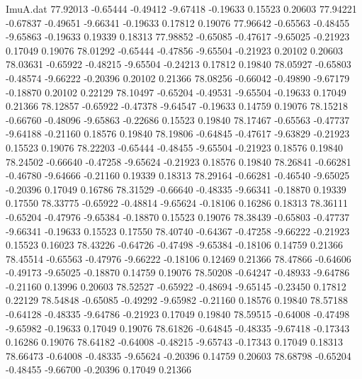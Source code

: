 \begin{filecontents}{ImuA.dat}
  77.92013   -0.65444   -0.49412   -9.67418   -0.19633    0.15523    0.20603
  77.94221   -0.67837   -0.49651   -9.66341   -0.19633    0.17812    0.19076
  77.96642   -0.65563   -0.48455   -9.65863   -0.19633    0.19339    0.18313
  77.98852   -0.65085   -0.47617   -9.65025   -0.21923    0.17049    0.19076
  78.01292   -0.65444   -0.47856   -9.65504   -0.21923    0.20102    0.20603
  78.03631   -0.65922   -0.48215   -9.65504   -0.24213    0.17812    0.19840
  78.05927   -0.65803   -0.48574   -9.66222   -0.20396    0.20102    0.21366
  78.08256   -0.66042   -0.49890   -9.67179   -0.18870    0.20102    0.22129
  78.10497   -0.65204   -0.49531   -9.65504   -0.19633    0.17049    0.21366
  78.12857   -0.65922   -0.47378   -9.64547   -0.19633    0.14759    0.19076
  78.15218   -0.66760   -0.48096   -9.65863   -0.22686    0.15523    0.19840
  78.17467   -0.65563   -0.47737   -9.64188   -0.21160    0.18576    0.19840
  78.19806   -0.64845   -0.47617   -9.63829   -0.21923    0.15523    0.19076
  78.22203   -0.65444   -0.48455   -9.65504   -0.21923    0.18576    0.19840
  78.24502   -0.66640   -0.47258   -9.65624   -0.21923    0.18576    0.19840
  78.26841   -0.66281   -0.46780   -9.64666   -0.21160    0.19339    0.18313
  78.29164   -0.66281   -0.46540   -9.65025   -0.20396    0.17049    0.16786
  78.31529   -0.66640   -0.48335   -9.66341   -0.18870    0.19339    0.17550
  78.33775   -0.65922   -0.48814   -9.65624   -0.18106    0.16286    0.18313
  78.36111   -0.65204   -0.47976   -9.65384   -0.18870    0.15523    0.19076
  78.38439   -0.65803   -0.47737   -9.66341   -0.19633    0.15523    0.17550
  78.40740   -0.64367   -0.47258   -9.66222   -0.21923    0.15523    0.16023
  78.43226   -0.64726   -0.47498   -9.65384   -0.18106    0.14759    0.21366
  78.45514   -0.65563   -0.47976   -9.66222   -0.18106    0.12469    0.21366
  78.47866   -0.64606   -0.49173   -9.65025   -0.18870    0.14759    0.19076
  78.50208   -0.64247   -0.48933   -9.64786   -0.21160    0.13996    0.20603
  78.52527   -0.65922   -0.48694   -9.65145   -0.23450    0.17812    0.22129
  78.54848   -0.65085   -0.49292   -9.65982   -0.21160    0.18576    0.19840
  78.57188   -0.64128   -0.48335   -9.64786   -0.21923    0.17049    0.19840
  78.59515   -0.64008   -0.47498   -9.65982   -0.19633    0.17049    0.19076
  78.61826   -0.64845   -0.48335   -9.67418   -0.17343    0.16286    0.19076
  78.64182   -0.64008   -0.48215   -9.65743   -0.17343    0.17049    0.18313
  78.66473   -0.64008   -0.48335   -9.65624   -0.20396    0.14759    0.20603
  78.68798   -0.65204   -0.48455   -9.66700   -0.20396    0.17049    0.21366

\end{filecontents}
